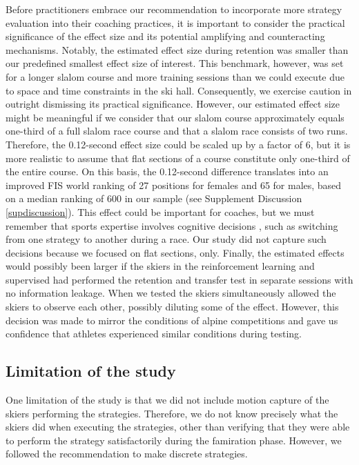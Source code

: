 \documentclass[pdflatex,sn-mathphys-num]{sn-jnl}%
\theoremstyle{thmstyleone}%
\theoremstyle{thmstyletwo}%
\theoremstyle{thmstylethree}%
\begin{document}
Before practitioners embrace our recommendation to incorporate more strategy evaluation into their coaching practices, it is important to consider the practical significance of the effect size and its potential amplifying and counteracting mechanisms\cite{anvari_not_2023}. Notably, the estimated effect size during retention was smaller than our predefined smallest effect size of interest. This benchmark, however, was set for a longer slalom course and more training sessions than we could execute due to space and time constraints in the ski hall. Consequently, we exercise caution in outright dismissing its practical significance. However, our estimated effect size might be meaningful if we consider that our slalom course approximately equals one-third of a full slalom race course and that a slalom race consists of two runs. Therefore, the 0.12-second effect size could be scaled up by a factor of 6, but it is more realistic to assume that flat sections of a course constitute only one-third of the entire course. On this basis, the 0.12-second difference translates into an improved FIS world ranking of 27 positions for females and 65 for males, based on a median ranking of 600 in our sample (see Supplement Discussion \ref{supdiscussion}). This effect could be important for coaches, but we must remember that sports expertise involves cognitive decisions  \cite{mangalam_investigating_2023, krakauer_motor_2019}, such as switching from one strategy to another during a race. Our study did not capture such decisions because we focused on flat sections, only. Finally, the estimated effects would possibly been larger if the skiers in the reinforcement learning and supervised had performed the retention and transfer test in separate sessions with no information leakage. When we tested the skiers simultaneously allowed the skiers to observe each other, possibly diluting some of the effect. However, this decision was made to mirror the conditions of alpine competitions and gave us confidence that athletes experienced similar conditions during testing.


\subsection{Limitation of the study}

One limitation of the study is that we did not include motion capture of the skiers performing the strategies. Therefore, we do not know precisely what the skiers did when executing the strategies, other than verifying that they were able to perform the strategy satisfactorily during the famiration phase. However, we followed the recommendation to make discrete strategies. 
\end{document}
